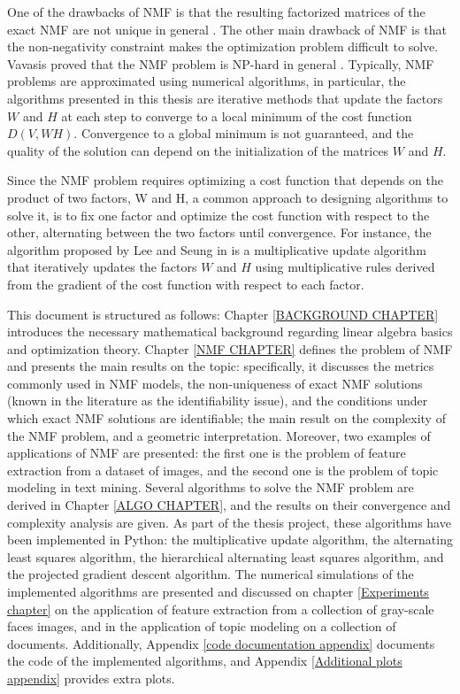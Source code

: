 One of the drawbacks of NMF is that the resulting factorized matrices of the exact NMF are not unique in general \cite{donoho2003does}.
The other main drawback of NMF is that the non-negativity constraint makes the optimization problem difficult to solve.
Vavasis proved that the NMF problem is NP-hard in general \cite{vavasis2007complexitynonnegativematrixfactorization}. 
Typically, NMF problems are approximated using numerical algorithms, in particular, the algorithms presented in this thesis are iterative methods that update the factors $W$ and $H$ at each step to converge to a local minimum of the cost function $D(V, WH)$.
Convergence to a global minimum is not guaranteed, and the quality of the solution can depend on the initialization of the matrices $W$ and $H$.

Since the NMF problem requires optimizing a cost function that depends on the product of two factors, W and H, a common approach to designing algorithms to solve it, is to fix one factor and optimize the cost function with respect to the other, alternating between the two factors until convergence.
For instance, the algorithm proposed by Lee and Seung in \cite{Lee1999} is a multiplicative update algorithm that iteratively updates the factors $W$ and $H$ using multiplicative rules derived from the gradient of the cost function with respect to each factor.

This document is structured as follows: Chapter \ref{BACKGROUND CHAPTER} introduces the necessary mathematical background regarding linear algebra basics and optimization theory.
Chapter \ref{NMF CHAPTER} defines the problem of NMF and presents the main results on the topic: 
specifically, it discusses the metrics commonly used in NMF models, the non-uniqueness of exact NMF solutions (known in the literature as the identifiability issue), and the conditions under which exact NMF solutions are identifiable; the main result on the complexity of the NMF problem, and a geometric interpretation. 
Moreover, two examples of applications of NMF are presented: the first one is the problem of feature extraction from a dataset of images, and the second one is the problem of topic modeling in text mining.
Several algorithms to solve the NMF problem are derived in Chapter \ref{ALGO CHAPTER}, and the
results on their convergence and complexity analysis are given. As part of the thesis project, these algorithms have been implemented in Python: the multiplicative update algorithm, the alternating least squares algorithm, the hierarchical alternating least squares algorithm, and the projected gradient descent algorithm. 
The numerical simulations of the implemented algorithms are presented and discussed on chapter \ref{Experiments chapter} on the application of feature extraction from a collection of gray-scale faces images, and in the application of topic modeling on a collection of documents. 
Additionally, Appendix \ref{code documentation appendix} documents the code of the implemented algorithms, and Appendix \ref{Additional plots appendix} provides extra plots.
